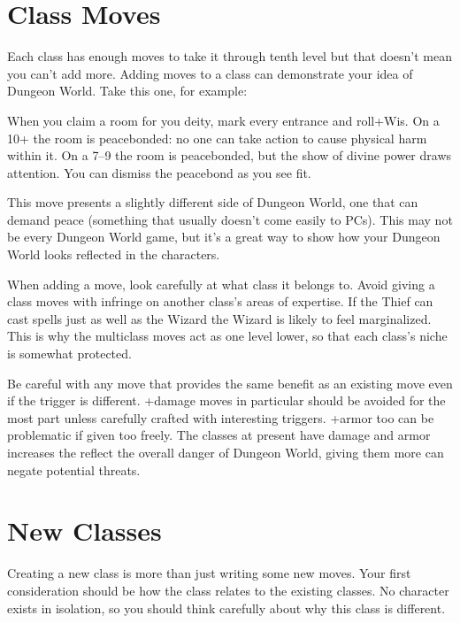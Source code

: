  
\section{Class Moves}    
 

Each class has enough moves to take it through tenth level but that doesn't mean you can't add more. Adding moves to a class can demonstrate your idea of Dungeon World. Take this one, for example:

 
\startExample
When you claim a room for you deity, mark every entrance and roll+Wis. On a 10+ the room is peacebonded: no one can take action to cause physical harm within it. On a 7–9 the room is peacebonded, but the show of divine power draws attention. You can dismiss the peacebond as you see fit.
\stopExample
 

This move presents a slightly different side of Dungeon World, one that can demand peace (something that usually doesn't come easily to PCs). This may not be every Dungeon World game, but it's a great way to show how your Dungeon World looks reflected in the characters.

 

When adding a move, look carefully at what class it belongs to. Avoid giving a class moves with infringe on another class's areas of expertise. If the Thief can cast spells just as well as the Wizard the Wizard is likely to feel marginalized. This is why the multiclass moves act as one level lower, so that each class's niche is somewhat protected.

 

Be careful with any move that provides the same benefit as an existing move even if the trigger is different. +damage moves in particular should be avoided for the most part unless carefully crafted with interesting triggers. +armor too can be problematic if given too freely. The classes at present have damage and armor increases the reflect the overall danger of Dungeon World, giving them more can negate potential threats.

 
\section{New Classes}   
 

Creating a new class is more than just writing some new moves. Your first consideration should be how the class relates to the existing classes. No character exists in isolation, so you should think carefully about why this class is different.

